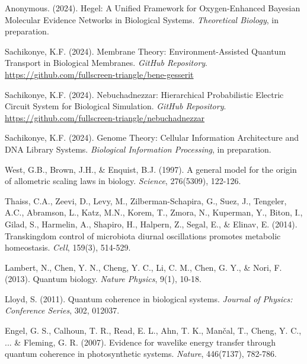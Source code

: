 \documentclass[twocolumn]{article}
\begin{document}
\begin{thebibliography}{99}

Anonymous. (2024). Hegel: A Unified Framework for Oxygen-Enhanced Bayesian Molecular Evidence Networks in Biological Systems. \textit{Theoretical Biology}, in preparation.

Sachikonye, K.F. (2024). Membrane Theory: Environment-Assisted Quantum Transport in Biological Membranes. \textit{GitHub Repository}. \url{https://github.com/fullscreen-triangle/bene-gesserit}

Sachikonye, K.F. (2024). Nebuchadnezzar: Hierarchical Probabilistic Electric Circuit System for Biological Simulation. \textit{GitHub Repository}. \url{https://github.com/fullscreen-triangle/nebuchadnezzar}

Sachikonye, K.F. (2024). Genome Theory: Cellular Information Architecture and DNA Library Systems. \textit{Biological Information Processing}, in preparation.

West, G.B., Brown, J.H., \& Enquist, B.J. (1997). A general model for the origin of allometric scaling laws in biology. \textit{Science}, 276(5309), 122-126.

Thaiss, C.A., Zeevi, D., Levy, M., Zilberman-Schapira, G., Suez, J., Tengeler, A.C., Abramson, L., Katz, M.N., Korem, T., Zmora, N., Kuperman, Y., Biton, I., Gilad, S., Harmelin, A., Shapiro, H., Halpern, Z., Segal, E., \& Elinav, E. (2014). Transkingdom control of microbiota diurnal oscillations promotes metabolic homeostasis. \textit{Cell}, 159(3), 514-529.

Lambert, N., Chen, Y. N., Cheng, Y. C., Li, C. M., Chen, G. Y., \& Nori, F. (2013). Quantum biology. \textit{Nature Physics}, 9(1), 10-18.

Lloyd, S. (2011). Quantum coherence in biological systems. \textit{Journal of Physics: Conference Series}, 302, 012037.

Engel, G. S., Calhoun, T. R., Read, E. L., Ahn, T. K., Mančal, T., Cheng, Y. C., ... \& Fleming, G. R. (2007). Evidence for wavelike energy transfer through quantum coherence in photosynthetic systems. \textit{Nature}, 446(7137), 782-786.

\end{thebibliography}
\end{document}
